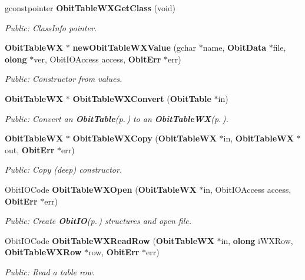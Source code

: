\begin{CompactItemize}
gconstpointer {\bf Obit\-Table\-WXGet\-Class} (void)
\begin{CompactList}\small\item\em Public: Class\-Info pointer. \item\end{CompactList}\item 
{\bf Obit\-Table\-WX} $\ast$ {\bf new\-Obit\-Table\-WXValue} (gchar $\ast$name, {\bf Obit\-Data} $\ast$file, {\bf olong} $\ast$ver, Obit\-IOAccess access, {\bf Obit\-Err} $\ast$err)
\begin{CompactList}\small\item\em Public: Constructor from values. \item\end{CompactList}\item 
{\bf Obit\-Table\-WX} $\ast$ {\bf Obit\-Table\-WXConvert} ({\bf Obit\-Table} $\ast$in)
\begin{CompactList}\small\item\em Public: Convert an {\bf Obit\-Table}{\rm (p.\,\pageref{structObitTable})} to an {\bf Obit\-Table\-WX}{\rm (p.\,\pageref{structObitTableWX})}. \item\end{CompactList}\item 
{\bf Obit\-Table\-WX} $\ast$ {\bf Obit\-Table\-WXCopy} ({\bf Obit\-Table\-WX} $\ast$in, {\bf Obit\-Table\-WX} $\ast$out, {\bf Obit\-Err} $\ast$err)
\begin{CompactList}\small\item\em Public: Copy (deep) constructor. \item\end{CompactList}\item 
Obit\-IOCode {\bf Obit\-Table\-WXOpen} ({\bf Obit\-Table\-WX} $\ast$in, Obit\-IOAccess access, {\bf Obit\-Err} $\ast$err)
\begin{CompactList}\small\item\em Public: Create {\bf Obit\-IO}{\rm (p.\,\pageref{structObitIO})} structures and open file. \item\end{CompactList}\item 
Obit\-IOCode {\bf Obit\-Table\-WXRead\-Row} ({\bf Obit\-Table\-WX} $\ast$in, {\bf olong} i\-WXRow, {\bf Obit\-Table\-WXRow} $\ast$row, {\bf Obit\-Err} $\ast$err)
\begin{CompactList}\small\item\em Public: Read a table row. \item\end{CompactList}\item 

\end{CompactItemize}
